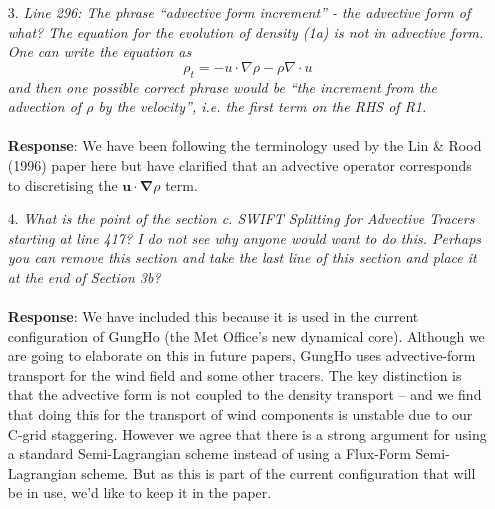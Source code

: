 \documentclass[11pt,a4paper]{article}
\begin{document}
\begin{enumerate}[leftmargin=*]
\item[3.] \textit{Line 296: The phrase ``advective form increment'' - the advective form of what? The equation for the evolution of density (1a) is not in advective form. One can write the equation as}
\begin{equation}
 \rho_t = -u\cdot\nabla\rho - \rho\nabla\cdot u   
\end{equation}
\textit{and then one possible correct phrase would be ``the increment from the advection of $\rho$ by the velocity'', i.e.
the first term on the RHS of R1.}
\\
\\
\textbf{Response}: We have been following the terminology used by the Lin \& Rood (1996) paper here but have clarified that an advective operator corresponds to discretising the $\bm{u\cdot\nabla}\rho$ term. 


\item[4.] \textit{What is the point of the section c. SWIFT Splitting for Advective Tracers starting at line 417? I do not see why anyone would want to do this. Perhaps you can remove this section and take the last line of this section and place it at the end of Section 3b?} \\
\\
\textbf{Response}: We have included this because it is used in the current configuration of GungHo (the Met Office's new dynamical core). Although we are going to elaborate on this in future papers, GungHo uses advective-form transport for the wind field and some other tracers. The key distinction is that the advective form is not coupled to the density transport -- and we find that doing this for the transport of wind components is unstable due to our C-grid staggering. However we agree that there is a strong argument for using a standard Semi-Lagrangian scheme instead of using a Flux-Form Semi-Lagrangian scheme. But as this is part of the current configuration that will be in use, we'd like to keep it in the paper.


\end{enumerate}
\end{document}
